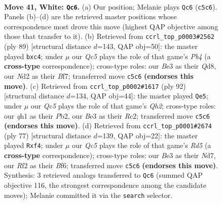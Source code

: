\documentclass[11pt]{article}
\begin{document}
\clearpage

\begin{figure}[p]\centering
\begin{subfigure}{0.46\textwidth}\centering
\resizebox{\linewidth}{!}{%
\newchessgame
\chessboard[
  setfen={1r3bk1/1rn2p2/8/2Q1p3/R3P3/4Bn2/3NKRN1/7q w - - 6 41},
  showmover=false,
  pgfstyle=straightmove, color=movearrow, markmove={c5-c6}
]}
\caption{}
\end{subfigure}\hfill
\begin{subfigure}{0.46\textwidth}\centering
\resizebox{\linewidth}{!}{%
\newchessgame
\chessboard[
  setfen={3q2k1/Q2n1b2/3r2p1/Pp1Nb2p/2P5/7P/2B3P1/5RBK b - - 0 45},
  showmover=false,
  pgfstyle=straightmove, color=movearrow, markmove={b5-c4}
]}
\caption{}
\end{subfigure}
\\[4pt]
\begin{subfigure}{0.46\textwidth}\centering
\resizebox{\linewidth}{!}{%
\newchessgame
\chessboard[
  setfen={5qk1/8/p2rb1p1/3N2pn/2B1P3/8/1PR4Q/1K6 w - - 5 47},
  showmover=false,
  pgfstyle=straightmove, color=movearrow, markmove={h2-e5}
]}
\caption{}
\end{subfigure}\hfill
\begin{subfigure}{0.46\textwidth}\centering
\resizebox{\linewidth}{!}{%
\newchessgame
\chessboard[
  setfen={8/3n2kp/5bp1/p7/3r1P2/Q4P1q/2R4P/1B3RK1 b - - 0 39},
  showmover=false,
  pgfstyle=straightmove, color=movearrow, markmove={d4-f4}
]}
\caption{}
\end{subfigure}
\caption{\textbf{Move 41, White: \texttt{Qc6}.} (a) Our position; Melanie plays \texttt{Qc6} (\texttt{c5c6}). Panels (b)--(d) are the retrieved master positions whose correspondence most drove this move (highest QAP objective among those that transfer to it). (b) Retrieved from \texttt{ccrl\_top\_p0003\#2562} (ply 89) [structural distance $d$=143, QAP obj=50]: the master played \texttt{bxc4}; under $\mu$ our \emph{Qc5} plays the role of that game's \emph{Pb4} (a \textbf{cross-type} correspondence); cross-type roles: our \emph{B}e3 as their \emph{Q}d8, our \emph{N}d2 as their \emph{B}f7; transferred move \texttt{c5c6} \textbf{(endorses this move)}. (c) Retrieved from \texttt{ccrl\_top\_p0002\#1617} (ply 92) [structural distance $d$=134, QAP obj=44]: the master played \texttt{Qe5}; under $\mu$ our \emph{Qc5} plays the role of that game's \emph{Qh2}; cross-type roles: our \emph{q}h1 as their \emph{P}b2, our \emph{B}e3 as their \emph{R}c2; transferred move \texttt{c5c6} \textbf{(endorses this move)}. (d) Retrieved from \texttt{ccrl\_top\_p0001\#2674} (ply 77) [structural distance $d$=139, QAP obj=22]: the master played \texttt{Rxf4}; under $\mu$ our \emph{Qc5} plays the role of that game's \emph{Rd5} (a \textbf{cross-type} correspondence); cross-type roles: our \emph{B}e3 as their \emph{N}d7, our \emph{R}f2 as their \emph{B}f6; transferred move \texttt{c5c6} \textbf{(endorses this move)}. Synthesis: 3 retrieved analogs transferred to \texttt{Qc6} (summed QAP objective 116, the strongest correspondence among the candidate moves); Melanie committed it via the \texttt{search} selector.}
\label{fig:thought-m80}
\end{figure}
\end{document}
